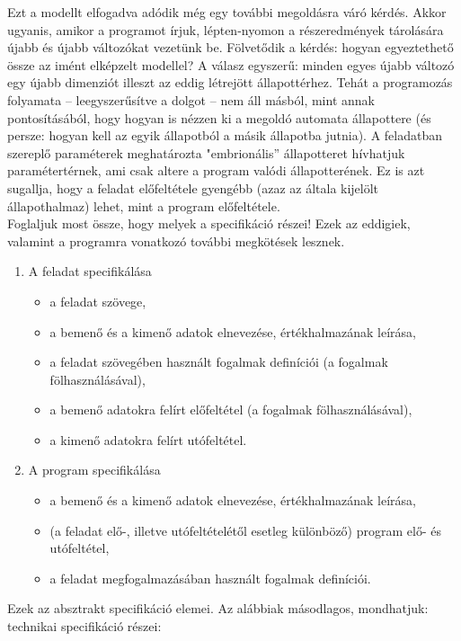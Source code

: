 \documentclass[12pt,margin=0px]{article}
\begin{document}
    \noindent Ezt a modellt elfogadva adódik még egy további megoldásra váró kérdés. Akkor ugyanis, amikor a programot írjuk, lépten-nyomon a részeredmények tárolására újabb és újabb változókat vezetünk be. Fölvetődik a kérdés: hogyan egyeztethető össze az imént elképzelt modellel? A válasz egyszerű: minden egyes újabb változó egy újabb dimenziót illeszt az eddig létrejött állapottérhez. Tehát a programozás folyamata – leegyszerűsítve a dolgot – nem áll másból, mint annak pontosításából, hogy hogyan is nézzen ki a megoldó automata állapottere (és persze: hogyan kell az egyik állapotból a másik állapotba jutnia). A feladatban szereplő paraméterek meghatározta "embrionális” állapotteret hívhatjuk paramétertérnek, ami csak altere a program valódi állapotterének. Ez is azt sugallja, hogy a feladat előfeltétele gyengébb (azaz az általa kijelölt állapothalmaz) lehet, mint a program előfeltétele.\\
	
    \noindent Foglaljuk most össze, hogy melyek a specifikáció részei! Ezek az eddigiek, valamint a programra vonatkozó további megkötések lesznek.
	
	\begin{enumerate}
		\item A feladat specifikálása
			\begin{itemize}
				\item a feladat szövege,
				\item a bemenő és a kimenő adatok elnevezése, értékhalmazának leírása,
				\item a feladat szövegében használt fogalmak definíciói (a fogalmak fölhasználásával),
				\item a bemenő adatokra felírt előfeltétel (a fogalmak fölhasználásával),
				\item a kimenő adatokra felírt utófeltétel.
			\end{itemize}
		\item A program specifikálása
			\begin{itemize}
				\item a bemenő és a kimenő adatok elnevezése, értékhalmazának leírása,
				\item (a feladat elő-, illetve utófeltételétől esetleg különböző) program elő- és utófeltétel,
				\item a feladat megfogalmazásában használt fogalmak definíciói.
			\end{itemize}
	\end{enumerate}	
	
	\noindent Ezek az absztrakt specifikáció elemei. Az alábbiak másodlagos, mondhatjuk: technikai specifikáció részei:
	
\end{document}
